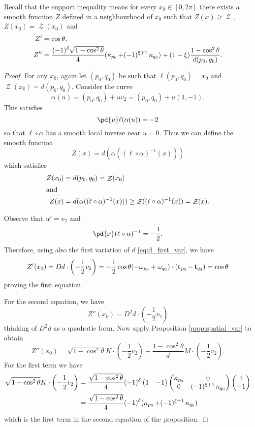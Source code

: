 \documentclass[11pt]{amsart}
\DeclareMathOperator{\chordarcprofile}{\mathcal{Z}}
\begin{document}
Recall that the support inequality means for every \(x_0 \in [0,2\pi]\) there exists a smooth function \(Z\) defined in a neighbourhood of \(x_0\) such that \(Z(x) \geq \chordarcprofile\), \(Z(x_0) = \chordarcprofile(x_0)\) and
\begin{align*}
Z' &= \cos \theta, \\
Z'' &= \frac{(-1)^{\delta}\sqrt{1-\cos^2\theta}}{4} (\operatorname{\kappa}_{p_0} + (-1)^{\xi+1}\operatorname{\kappa}_{q_0}) + (1-\xi) \frac{1-\cos^2\theta}{d(p_0,q_0)}.
\end{align*}

\begin{proof}
For any $x_0$, again let $(p_0,q_0)$ be such that $\ell(p_0,q_0) = x_0$ and $\chordarcprofile(x_0) = d(p_0,q_0)$. Consider the curve
\[
\alpha(u) = (p_0, q_0) + uv_2 = (p_0, q_0) + u(1,-1).
\]
This satisfies
\[
\pd{u} \ell(\alpha(u)) = -2
\]
so that $\ell\circ\alpha$ has a smooth local inverse near $u=0$. Thus we can define the smooth function
\[
Z(x) = d(\alpha((\ell\circ\alpha)^{-1} (x)))
\]
which satisfies
\begin{align*}
Z(x_0) &= d(p_0, q_0) = \chordarcprofile(x_0) \\
\intertext{and}
Z(x) &= d(\alpha((\ell\circ\alpha)^{-1} (x))) \geq \chordarcprofile ((\ell\circ\alpha)^{-1} (x)) = \chordarcprofile(x).
\end{align*}

Observe that $\alpha' = v_2$ and
\[
\pd{x} (\ell\circ\alpha)^{-1} = -\frac{1}{2}.
\]
Therefore, using also the first variation of $d$ \eqref{eq:d_first_var}, we have
\[
Z'(x_0) = Dd \cdot \left(-\frac{1}{2}v_2\right) = -\frac{1}{2} \cos\theta (-\omega_{p_0} + \omega_{q_0}) \cdot (\operatorname{\mathbf{t}}_{p_0} - \operatorname{\mathbf{t}}_{q_0}) = \cos\theta
\]
proving the first equation.

For the second equation, we have
\[
Z''(x_0) = D^2 d \cdot \left(-\frac{1}{2} v_2\right)
\]
thinking of $D^2 d$ as a quadratic form. Now apply Proposition \ref{prop:spatial_var} to obtain
\[
Z''(x_0) = \sqrt{1-\cos^2\theta} K\cdot \left(-\frac{1}{2} v_2\right) + \frac{1-\cos^2\theta}{d} M \cdot \left(-\frac{1}{2} v_2\right).
\]
For the first term we have
\begin{align*}
\sqrt{1-\cos^2\theta} K \cdot \left(-\frac{1}{2} v_2\right) &= \frac{\sqrt{1-\cos^2\theta}}{4} (-1)^{\delta} 
\begin{pmatrix}
1 & -1
\end{pmatrix}
\begin{pmatrix}
\operatorname{\kappa}_{p_0} & 0 \\
0 & (-1)^{\xi + 1} \operatorname{\kappa}_{q_0}
\end{pmatrix}
\begin{pmatrix}
1 \\
-1
\end{pmatrix} \\
&= \frac{\sqrt{1-\cos^2\theta}}{4} (-1)^{\delta} (\operatorname{\kappa}_{p_0} + (-1)^{\xi + 1} \operatorname{\kappa}_{q_0})
\end{align*}
which is the first term in the second equation of the proposition.


\end{proof}
\end{document}
